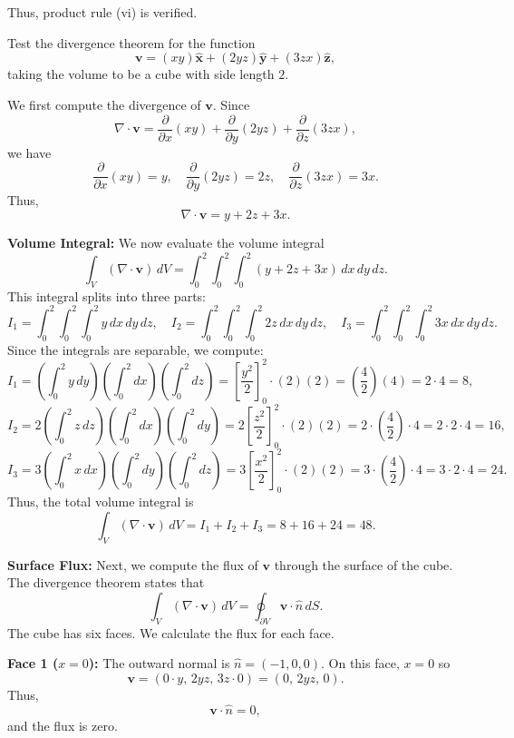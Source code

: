 \begin{hwkProblem}{1.25}{}
	Thus, product rule (vi) is verified.

\end{hwkProblem}

\begin{hwkProblem}{1.33}{}
	Test the divergence theorem for the function 
	\[
		\mathbf{v} = (xy)\hat{\mathbf{x}} + (2yz)\hat{\mathbf{y}} + (3zx)\hat{\mathbf{z}},
	\]
	taking the volume to be a cube with side length \(2\).

	\hwkSol

	We first compute the divergence of \(\mathbf{v}\). Since
	\[
		\nabla\cdot\mathbf{v} = \frac{\partial}{\partial x}(xy) + \frac{\partial}{\partial y}(2yz) + \frac{\partial}{\partial z}(3zx),
	\]
	we have
	\[
		\frac{\partial}{\partial x}(xy) = y,\quad \frac{\partial}{\partial y}(2yz)=2z,\quad \frac{\partial}{\partial z}(3zx)=3x.
	\]
	Thus,
	\[
		\nabla\cdot\mathbf{v} = y+2z+3x.
	\]

	\textbf{Volume Integral:}  
	We now evaluate the volume integral
	\[
		\int_V (\nabla\cdot\mathbf{v})\,dV = \int_{0}^{2}\int_{0}^{2}\int_{0}^{2} (y+2z+3x)\,dx\,dy\,dz.
	\]
	This integral splits into three parts:
	\[
		I_1 = \int_{0}^{2}\int_{0}^{2}\int_{0}^{2} y\,dx\,dy\,dz,\quad I_2 = \int_{0}^{2}\int_{0}^{2}\int_{0}^{2} 2z\,dx\,dy\,dz,\quad I_3 = \int_{0}^{2}\int_{0}^{2}\int_{0}^{2} 3x\,dx\,dy\,dz.
	\]
	Since the integrals are separable, we compute:
	\[
		I_1 = \left(\int_{0}^{2} y\,dy\right)\left(\int_{0}^{2} dx\right)\left(\int_{0}^{2} dz\right)
		= \left[\frac{y^2}{2}\right]_{0}^{2}\cdot (2)(2)
		= \left(\frac{4}{2}\right)(4)=2\cdot 4 = 8,
	\]
	\[
		I_2 = 2\left(\int_{0}^{2} z\,dz\right)\left(\int_{0}^{2} dx\right)\left(\int_{0}^{2} dy\right)
		= 2\left[\frac{z^2}{2}\right]_{0}^{2}\cdot (2)(2)
		= 2\cdot \left(\frac{4}{2}\right)\cdot 4
		= 2\cdot 2\cdot 4 = 16,
	\]
	\[
		I_3 = 3\left(\int_{0}^{2} x\,dx\right)\left(\int_{0}^{2} dy\right)\left(\int_{0}^{2} dz\right)
		= 3\left[\frac{x^2}{2}\right]_{0}^{2}\cdot (2)(2)
		= 3\cdot \left(\frac{4}{2}\right)\cdot 4
		= 3\cdot 2\cdot 4 = 24.
	\]
	Thus, the total volume integral is
	\[
		\int_V (\nabla\cdot\mathbf{v})\,dV = I_1+I_2+I_3 = 8+16+24 = 48.
	\]

	\textbf{Surface Flux:}  
	Next, we compute the flux of \(\mathbf{v}\) through the surface of the cube. The divergence theorem states that
	\[
		\int_V (\nabla\cdot\mathbf{v})\,dV = \oint_{\partial V} \mathbf{v}\cdot\hat{n}\,dS.
	\]
	The cube has six faces. We calculate the flux for each face.

	\textbf{Face 1 (\(x=0\)):}  
	The outward normal is \(\hat{n} = (-1,0,0)\). On this face, \(x=0\) so
	\[
		\mathbf{v} = (0\cdot y,\,2yz,\,3z\cdot 0) = (0,\,2yz,\,0).
	\]
	Thus,
	\[
		\mathbf{v}\cdot\hat{n} = 0,
	\]
	and the flux is zero.


\end{hwkProblem}
